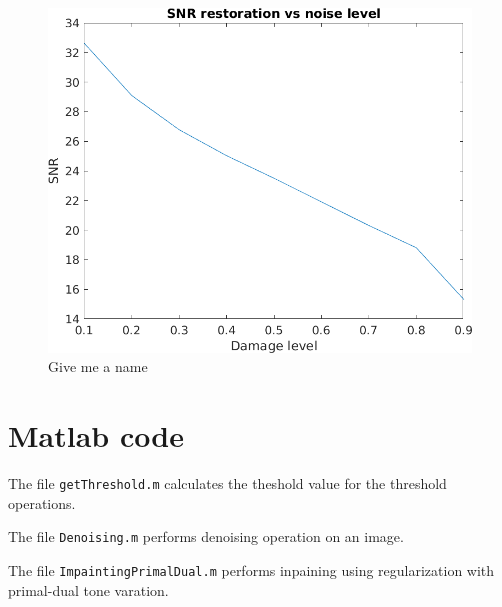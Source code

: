 \documentclass[a4paper,12pt]{article}
\begin{document}
\begin{figure}[t]
        \centering
        \includegraphics{../Results/Inpainting_lena_noise_vs_SNR.png}
        \caption{Give me a name} 
		\label{fig:nvssnr}
\end{figure}

\FloatBarrier
\section{Matlab code}
The file \texttt{getThreshold.m} calculates the theshold value for the threshold operations.


\vspace{18pt}
\noindent The file \texttt{Denoising.m} performs denoising operation on an image.


\vspace{18pt} 
\noindent The file \texttt{ImpaintingPrimalDual.m} performs inpaining using regularization with primal-dual tone varation.

\end{document}
